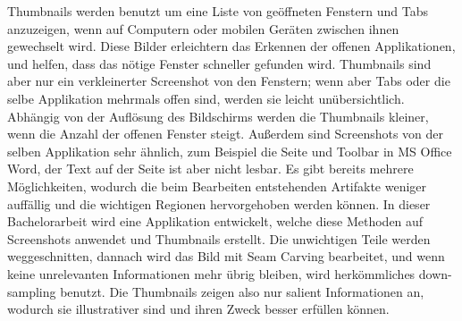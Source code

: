 \documentclass[draft,final]{vutinfth} %
\begin{document}
	
	\frontmatter %
	
	\addstatementpage
	
	\begin{danksagung*}
	\end{danksagung*}
	
	\begin{acknowledgements*}
	\end{acknowledgements*}
	
	\begin{kurzfassung} 
		Thumbnails werden benutzt um eine Liste von geöffneten Fenstern und Tabs anzuzeigen, wenn auf Computern oder mobilen Geräten zwischen ihnen gewechselt wird.
		Diese Bilder erleichtern das Erkennen der offenen Applikationen, und helfen, dass das nötige Fenster schneller gefunden wird.
		Thumbnails sind aber nur ein verkleinerter Screenshot von den Fenstern; wenn aber Tabs oder die selbe Applikation mehrmals offen sind, werden sie leicht unübersichtlich.
		Abhängig von der Auflösung des Bildschirms werden die Thumbnails kleiner, wenn die Anzahl der offenen Fenster steigt.
		Außerdem sind Screenshots von der selben Applikation sehr ähnlich, zum Beispiel die Seite und Toolbar in MS Office Word, der Text auf der Seite ist aber nicht lesbar. 
		Es gibt bereits mehrere Möglichkeiten, wodurch die beim Bearbeiten entstehenden Artifakte weniger auffällig und die wichtigen Regionen hervorgehoben werden können.
		In dieser Bachelorarbeit wird eine Applikation entwickelt, welche diese Methoden auf Screenshots anwendet und Thumbnails erstellt.
		Die unwichtigen Teile  werden weggeschnitten, dannach wird das Bild mit Seam Carving bearbeitet, und wenn keine unrelevanten Informationen mehr übrig bleiben, wird herkömmliches down-sampling benutzt.
		Die Thumbnails zeigen also nur salient Informationen an, wodurch sie illustrativer sind und ihren Zweck besser erfüllen können.
		
	\end{kurzfassung}
	
\end{document}
